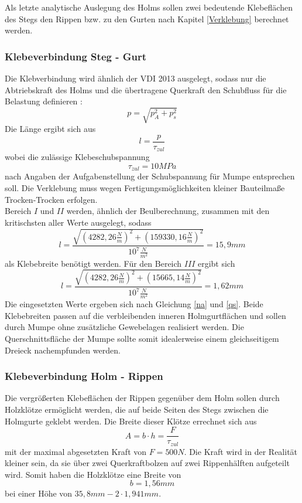 

\noindent Als letzte analytische Auslegung des Holms sollen zwei bedeutende Klebeflächen des Stegs den Rippen bzw. zu den Gurten nach Kapitel \ref{Verklebung} berechnet werden.
\subsubsection{Klebeverbindung Steg - Gurt}
Die Klebverbindung wird ähnlich der VDI 2013 ausgelegt, sodass nur die Abtriebskraft des Holms und die übertragene Querkraft den Schubfluss für die Belastung definieren \cite{item23}\cite{item5}:
\begin{equation}
	p=\sqrt{p_{A}^{2}+p_{s}^{2}}
\end{equation}
Die Länge ergibt sich aus 
\begin{equation}
	l=\frac{p}{\tau_{zul}}
\end{equation}
wobei die zulässige Klebeschubspannung
\begin{equation}
	\tau_{zul}=10 MPa
\end{equation}
nach Angaben der Aufgabenstellung der Schubspannung für Mumpe entsprechen soll. Die Verklebung muss wegen Fertigungsmöglichkeiten kleiner Bauteilmaße \glqq Trocken-Trocken\grqq\: erfolgen.\\

\noindent Bereich $I$ und $II$ werden, ähnlich der Beulberechnung, zusammen mit den kritischsten aller Werte ausgelegt, sodass 
\begin{equation}
	l=\frac{\sqrt{(4282,26\frac{N}{m})^{2}+(159330,16\frac{N}{m})^{2}}}{10^{7}\frac{N}{m^{2}}}=15,9mm
\end{equation}
als Klebebreite benötigt werden. Für den Bereich $III$ ergibt sich
\begin{equation}
	l=\frac{\sqrt{(4282,26\frac{N}{m})^{2}+(15665,14\frac{N}{m})^{2}}}{10^{7}\frac{N}{m^{2}}}=1,62mm
\end{equation}
Die eingesetzten Werte ergeben sich nach Gleichung \ref{na} und \ref{qs}. Beide Klebebreiten passen auf die verbleibenden inneren Holmgurtflächen und sollen durch Mumpe ohne zusätzliche Gewebelagen realisiert werden. Die Querschnittsfläche der Mumpe sollte somit idealerweise einem gleichseitigem Dreieck nachempfunden werden.

\subsubsection{Klebeverbindung Holm - Rippen}
Die vergrößerten Klebeflächen der Rippen gegenüber dem Holm sollen durch Holzklötze ermöglicht werden, die auf beide Seiten des Stegs zwischen die Holmgurte geklebt werden. Die Breite dieser Klötze errechnet sich aus 
\begin{equation}
	A=b\cdot h=\frac{F}{\tau_{zul}}
\end{equation}
mit der maximal abgesetzten Kraft von $F=500N$. Die Kraft wird in der Realität kleiner sein, da sie über zwei Querkraftbolzen auf zwei Rippenhälften aufgeteilt wird.
Somit haben die Holzklötze eine Breite von 
\begin{equation}
	b=1,56mm
\end{equation}
bei einer Höhe von $35,8mm-2\cdot 1,941mm$.